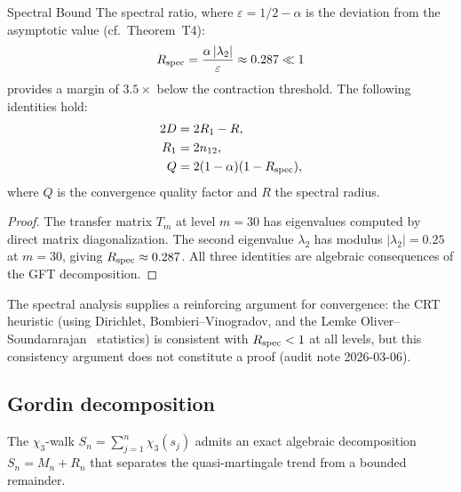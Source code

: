 \documentclass[12pt,a4paper]{article}
\begin{document}
\begin{thmbox}{Spectral Bound}
\label{thm:spectral}
The spectral ratio, where $\varepsilon = 1/2 - \alpha$ is the
deviation from the asymptotic value (cf.\ Theorem~T4):
\begin{equation}
  R_{\rm spec} = \frac{\alpha\,|\lambda_2|}{\varepsilon}
  \approx 0.287 \ll 1
  \label{eq:R_spec}
\end{equation}
provides a margin of $3.5\times$ below the contraction threshold.
The following identities hold:
\begin{align}
  2D    &= 2R_1 - R, \label{eq:id1} \\
  R_1   &= 2n_{12}, \label{eq:id2} \\
  Q     &= 2(1-\alpha)(1 - R_{\rm spec}), \label{eq:id3}
\end{align}
where $Q$ is the convergence quality factor and $R$ the spectral
radius.

\begin{proof}
The transfer matrix $T_m$ at level $m = 30$ has eigenvalues
computed by direct matrix diagonalization. The second eigenvalue
$\lambda_2$ has modulus $|\lambda_2| = 0.25$ at $m = 30$,
giving $R_{\rm spec} \approx 0.287$. All three identities
are algebraic consequences of the GFT decomposition.
\end{proof}
\end{thmbox}

The spectral analysis supplies a reinforcing argument for convergence:
the CRT heuristic (using Dirichlet, Bombieri--Vinogradov, and the
Lemke Oliver--Soundararajan~\cite{LemkeOliverSoundararajan2016} statistics) is consistent with $R_{\rm spec} < 1$
at all levels, but this consistency argument does not constitute a
proof (audit note 2026-03-06).

\subsection{Gordin decomposition}
\label{sec:ch7_gordin}

The $\chi_3$-walk $S_n = \sum_{j=1}^n \chi_3(s_j)$ admits an exact
algebraic decomposition $S_n = M_n + R_n$ that separates the
quasi-martingale trend from a bounded remainder.
\end{document}
